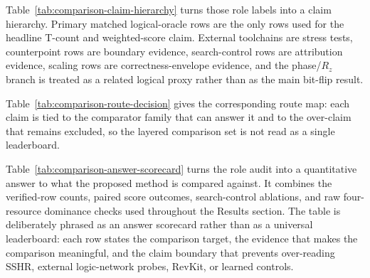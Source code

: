 \documentclass[11pt]{article}
\newcommand{\rz}{\ensuremath{R_z}}
\begin{document}
Table~\ref{tab:comparison-claim-hierarchy} turns those role labels into a
claim hierarchy.  Primary matched logical-oracle rows are the only rows used
for the headline T-count and weighted-score claim.  External toolchains are
stress tests, counterpoint rows are boundary evidence, search-control rows are
attribution evidence, scaling rows are correctness-envelope evidence, and the
phase/\rz{} branch is treated as a related logical proxy rather than as the
main bit-flip result.

\begin{table}[H]
\centering
\tiny
\setlength{\tabcolsep}{2pt}
\renewcommand{\arraystretch}{0.94}
\caption{Comparison-claim hierarchy.  The table classifies each comparison
family by the manuscript claim tier it is allowed to support and by the
stronger interpretation that remains excluded.}
\label{tab:comparison-claim-hierarchy}

\end{table}

Table~\ref{tab:comparison-route-decision} gives the corresponding route map:
each claim is tied to the comparator family that can answer it and to the
over-claim that remains excluded, so the layered comparison set is not read as
a single leaderboard.

\begin{table}[H]
\centering
\tiny
\setlength{\tabcolsep}{2pt}
\renewcommand{\arraystretch}{0.94}
\caption{Comparison-route decision audit.  Each row states which comparator
family should be used for a reviewer-facing claim and which stronger
interpretation is excluded by the current logical-layer evidence.}
\label{tab:comparison-route-decision}

\end{table}

Table~\ref{tab:comparison-answer-scorecard} turns the role audit into a
quantitative answer to what the proposed method is compared against.  It
combines the verified-row counts, paired score outcomes, search-control
ablations, and raw four-resource dominance checks used throughout the Results
section.  The table is deliberately phrased as an answer scorecard rather than
as a universal leaderboard: each row states the comparison target, the
evidence that makes the comparison meaningful, and the claim boundary that
prevents over-reading SSHR, external logic-network probes, RevKit, or learned
controls.

\begin{table}[H]
\centering
\tiny
\setlength{\tabcolsep}{2pt}
\renewcommand{\arraystretch}{0.94}
\caption{Comparison answer scorecard.  The table gives the short answer to
``compared with what?'' by linking each comparison target to verified evidence,
headline quantitative outcomes, and the excluded claim that keeps the
logical-layer comparison meaningful.}
\label{tab:comparison-answer-scorecard}

\end{table}
\end{document}
